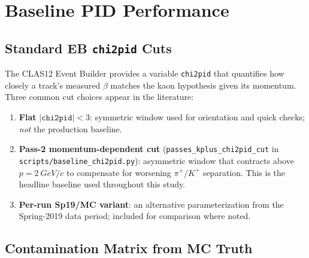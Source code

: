 \documentclass[11pt]{article}
\newcommand{\Kp}{K^{+}}
\newcommand{\pip}{\pi^{+}}
\begin{document}
\section{Baseline PID Performance}
\label{sec:baseline}

\subsection{Standard EB \texttt{chi2pid} Cuts}

The CLAS12 Event Builder provides a variable \texttt{chi2pid} that quantifies
how closely a track's measured $\beta$ matches the kaon hypothesis given its
momentum.
Three common cut choices appear in the literature:
\begin{enumerate}
  \item \textbf{Flat} $|\texttt{chi2pid}| < 3$: symmetric window used for
        orientation and quick checks; \emph{not} the production baseline.
  \item \textbf{Pass-2 momentum-dependent cut}
        (\texttt{passes\_kplus\_chi2pid\_cut} in
        \texttt{scripts/baseline\_chi2pid.py}): asymmetric window that
        contracts above $p = \SI{2}{GeV/c}$ to compensate for worsening
        $\pip$/$\Kp$ separation.
        This is the headline baseline used throughout this study.
  \item \textbf{Per-run Sp19/MC variant}: an alternative parameterization
        from the Spring-2019 data period; included for comparison where noted.
\end{enumerate}


\subsection{Contamination Matrix from MC Truth}
\label{sec:contam_matrix}
\end{document}
